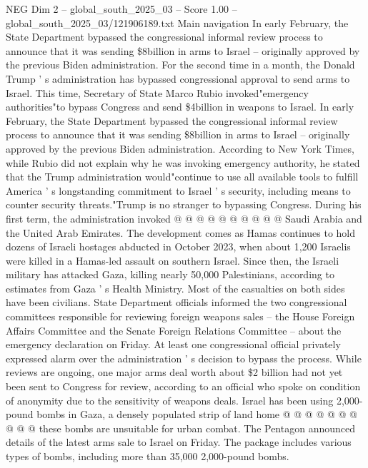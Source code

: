 \begin{textsample}{NEG Dim 2 – global\_south\_2025\_03 – Score 1.00 – global\_south\_2025\_03/121906189.txt}  \label{ex:f2_neg_162}
Main navigation In early February, the State Department bypassed the congressional informal review process to announce that it was sending \$8billion in arms to Israel -- originally approved by the previous Biden administration.
For the second time in a month, the Donald Trump ' s administration has bypassed congressional approval to send arms to Israel.
This time, Secretary of State Marco Rubio invoked"emergency authorities"to bypass Congress and send \$4billion in weapons to Israel.
In early February, the State Department bypassed the congressional informal review process to announce that it was sending \$8billion in arms to Israel -- originally approved by the previous Biden administration.
According to New York Times, while Rubio did not explain why he was invoking emergency authority, he stated that the Trump administration would"continue to use all available tools to fulfill America ' s longstanding commitment to Israel ' s security, including means to counter security threats."Trump is no stranger to bypassing Congress.
During his first term, the administration invoked @ @ @ @ @ @ @ @ @ @ Saudi Arabia and the United Arab Emirates.
The development comes as Hamas continues to hold dozens of Israeli hostages abducted in October 2023, when about 1,200 Israelis were killed in a Hamas-led assault on southern Israel.
Since then, the Israeli military has attacked Gaza, killing nearly 50,000 Palestinians, according to estimates from Gaza ' s Health Ministry.
Most of the casualties on both sides have been civilians.
State Department officials informed the two congressional committees responsible for reviewing foreign weapons sales -- the House Foreign Affairs Committee and the Senate Foreign Relations Committee -- about the emergency declaration on Friday.
At least one congressional official privately expressed alarm over the administration ' s decision to bypass the process.
While reviews are ongoing, one major arms deal worth about \$2 billion had not yet been sent to Congress for review, according to an official who spoke on condition of anonymity due to the sensitivity of weapons deals.
Israel has been using 2,000-pound bombs in Gaza, a densely populated strip of land home @ @ @ @ @ @ @ @ @ @ these bombs are unsuitable for urban combat.
The Pentagon announced details of the latest arms sale to Israel on Friday.
The package includes various types of bombs, including more than 35,000 2,000-pound bombs.

\end{textsample}

